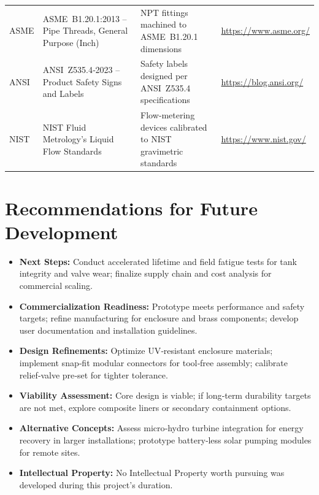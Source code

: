 \begin{longtable}{%
    p{1.2cm}   %
    p{4cm}   %
    p{6cm}   %
    p{3.8cm}   %
}
ASME  & ASME B1.20.1:2013 – Pipe Threads, General Purpose (Inch)
      & NPT fittings machined to ASME B1.20.1 dimensions
      & \url{https://www.asme.org/} \\

ANSI  & ANSI Z535.4‑2023 – Product Safety Signs and Labels
      & Safety labels designed per ANSI Z535.4 specifications
      & \url{https://blog.ansi.org/} \\

NIST  & NIST Fluid Metrology’s Liquid Flow Standards
      & Flow‑metering devices calibrated to NIST gravimetric standards
      & \url{https://www.nist.gov/} \\

\end{longtable}

\section{Recommendations for Future Development}
\begin{itemize}
  \item \textbf{Next Steps:} Conduct accelerated lifetime and field fatigue tests for tank integrity and valve wear; finalize supply chain and cost analysis for commercial scaling.
  \item \textbf{Commercialization Readiness:} Prototype meets performance and safety targets; refine manufacturing for enclosure and brass components; develop user documentation and installation guidelines.
  \item \textbf{Design Refinements:} Optimize UV‑resistant enclosure materials; implement snap‑fit modular connectors for tool‑free assembly; calibrate relief‑valve pre‑set for tighter tolerance.
  \item \textbf{Viability Assessment:} Core design is viable; if long‑term durability targets are not met, explore composite liners or secondary containment options.
  \item \textbf{Alternative Concepts:} Assess micro‑hydro turbine integration for energy recovery in larger installations; prototype battery‑less solar pumping modules for remote sites.
  \item \textbf{Intellectual Property:} No Intellectual Property worth pursuing was developed during this project's duration.
\end{itemize}

